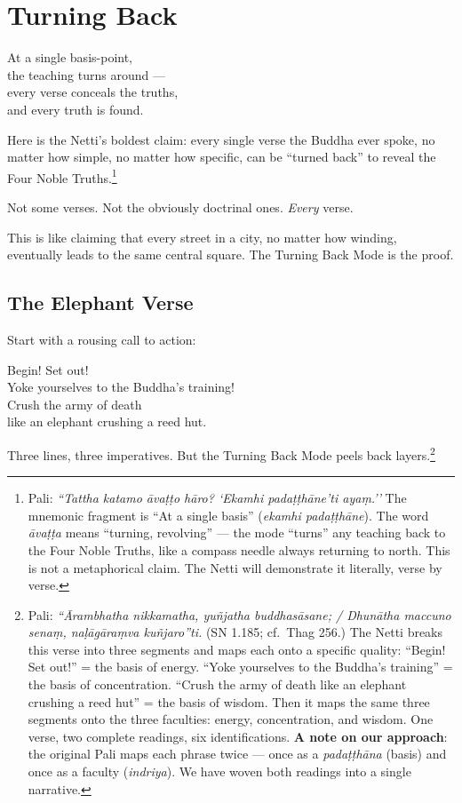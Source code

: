\chapter{Turning Back}
\label{ch:turning-back}

\begin{versebox}
At a single basis-point,\\
the teaching turns around ---\\
every verse conceals the truths,\\
and every truth is found.
\end{versebox}

\noindent Here is the Netti's boldest claim: every single verse the Buddha ever spoke, no matter how simple, no matter how specific, can be ``turned back'' to reveal the Four Noble Truths.\footnote{Pali: \textit{``Tattha katamo āvaṭṭo hāro? `Ekamhi padaṭṭhāne'ti ayaṃ.''} The mnemonic fragment is ``At a single basis'' (\textit{ekamhi padaṭṭhāne}). The word \textit{āvaṭṭa} means ``turning, revolving'' --- the mode ``turns'' any teaching back to the Four Noble Truths, like a compass needle always returning to north. This is not a metaphorical claim. The Netti will demonstrate it literally, verse by verse.}

Not some verses. Not the obviously doctrinal ones. \textit{Every} verse.

This is like claiming that every street in a city, no matter how winding, eventually leads to the same central square. The Turning Back Mode is the proof.

\section*{The Elephant Verse}

Start with a rousing call to action:

\begin{versebox}
Begin! Set out!\\
Yoke yourselves to the Buddha's training!\\
Crush the army of death\\
like an elephant crushing a reed hut.
\end{versebox}

Three lines, three imperatives. But the Turning Back Mode peels back layers.\footnote{Pali: \textit{``Ārambhatha nikkamatha, yuñjatha buddhasāsane; / Dhunātha maccuno senaṃ, naḷāgāraṃva kuñjaro''ti.} (SN 1.185; cf.\ Thag 256.) The Netti breaks this verse into three segments and maps each onto a specific quality: ``Begin! Set out!'' = the basis of energy. ``Yoke yourselves to the Buddha's training'' = the basis of concentration. ``Crush the army of death like an elephant crushing a reed hut'' = the basis of wisdom. Then it maps the same three segments onto the three faculties: energy, concentration, and wisdom. One verse, two complete readings, six identifications. \textbf{A note on our approach}: the original Pali maps each phrase twice --- once as a \textit{padaṭṭhāna} (basis) and once as a faculty (\textit{indriya}). We have woven both readings into a single narrative.}

